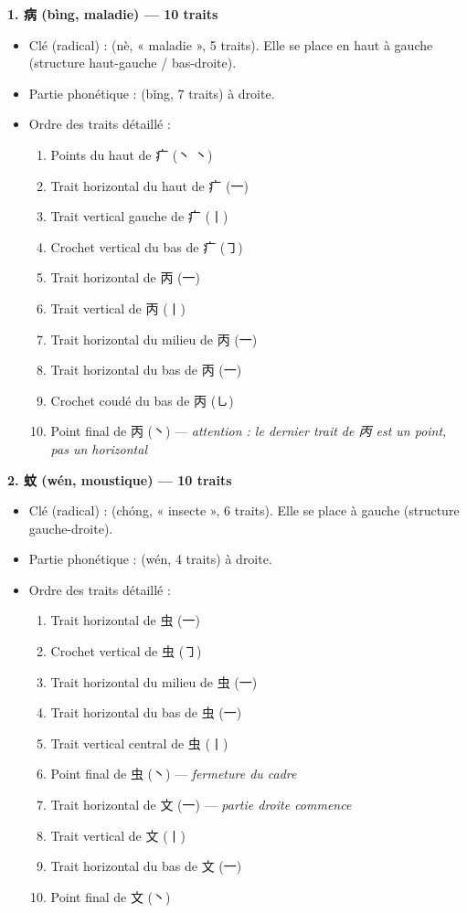 \documentclass[11pt]{article}
\newcommand{\cle}[1]{{\popxbold\color{popdark}#1}}
\newcommand{\zh}[1]{\ifmmode\text{#1}\else{#1}\fi}
\begin{document}
\begin{propriete}
\textbf{1. 病  (bìng, maladie) — 10 traits}
\begin{itemize}
\item \cle{Clé (radical) :} \zh{疒} (nè, « maladie », 5 traits). Elle se place en haut à gauche (structure \cle{haut-gauche / bas-droite}).
\item \cle{Partie phonétique :} \zh{丙} (bǐng, 7 traits) à droite.
\item \cle{Ordre des traits détaillé :}
\begin{enumerate}
\item Points du haut de 疒 (丶 丶)
\item Trait horizontal du haut de 疒 (一)
\item Trait vertical gauche de 疒 (丨)
\item Crochet vertical du bas de 疒 (㇆)
\item Trait horizontal de 丙 (一)
\item Trait vertical de 丙 (丨)
\item Trait horizontal du milieu de 丙 (一)
\item Trait horizontal du bas de 丙 (一)
\item Crochet coudé du bas de 丙 (㇟)
\item Point final de 丙 (丶) — \emph{attention : le dernier trait de 丙 est un point, pas un horizontal}
\end{enumerate}
\end{itemize}

\textbf{2. 蚊  (wén, moustique) — 10 traits}
\begin{itemize}
\item \cle{Clé (radical) :} \zh{虫} (chóng, « insecte », 6 traits). Elle se place à gauche (structure \cle{gauche-droite}).
\item \cle{Partie phonétique :} \zh{文} (wén, 4 traits) à droite.
\item \cle{Ordre des traits détaillé :}
\begin{enumerate}
\item Trait horizontal de 虫 (一)
\item Crochet vertical de 虫 (㇆)
\item Trait horizontal du milieu de 虫 (一)
\item Trait horizontal du bas de 虫 (一)
\item Trait vertical central de 虫 (丨)
\item Point final de 虫 (丶) — \emph{fermeture du cadre}
\item Trait horizontal de 文 (一) — \emph{partie droite commence}
\item Trait vertical de 文 (丨)
\item Trait horizontal du bas de 文 (一)
\item Point final de 文 (丶)
\end{enumerate}
\end{itemize}


\end{propriete}
\end{document}
